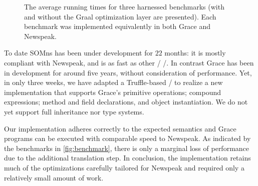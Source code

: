 \begin{figure}
    \centering
    \makebox[\columnwidth][c]{
        \resizebox{\columnwidth}{!}{
            
        }
    }
    \caption{The average running times for three harnessed benchmarks (with and without the Graal optimization layer are presented). Each benchmark was implemented equivalently in both Grace and Newspeak. }
    \label{fig:benchmark}
\end{figure}





To date SOMns has been under development for $22$ months: it is mostly compliant with Newspeak, and is as fast as other \JITing/ \vms/. In contrast Grace has been in development for around five years, without consideration of performance. Yet, in only three weeks, we have adapted a Truffle-based \vm/ to realize a new implementation that supports Grace's primitive operations; compound expressions; method and field declarations, and object instantiation. We do not yet support full inheritance nor type systems.

Our implementation adheres correctly to the expected semantics and Grace programs can be executed with comparable speed to Newspeak. As indicated by the benchmarks in \autoref{fig:benchmark}, there is only a marginal loss of performance due to the additional translation step. In conclusion, the implementation retains much of the optimizations carefully tailored for Newspeak and required only a relatively small amount of work.



